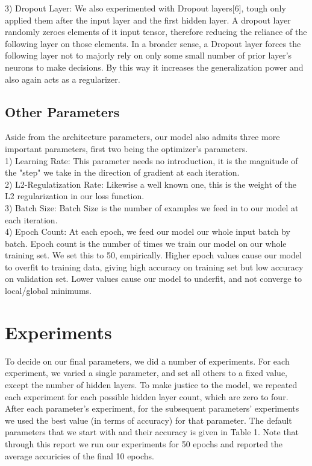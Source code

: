 \documentclass[conference,compsoc]{IEEEtran}
\begin{document}
3) Dropout Layer: We also experimented with Dropout layers[6], tough only applied them after the input layer and the first hidden layer. A dropout layer randomly zeroes elements of it input tensor, therefore reducing the reliance of the following layer on those elements. In a broader sense, a Dropout layer forces the following layer not to majorly rely on only some small number of prior layer's neurons to make decisions. By this way it increases the generalization power and also again acts as a regularizer.\\

\subsection{Other Parameters}

Aside from the architecture parameters, our model also admits three more important parameters, first two being the optimizer's parameters. \\

1) Learning Rate: This parameter needs no introduction, it is the magnitude of the "step" we take in the direction of gradient at each iteration. \\

2) L2-Regulatization Rate: Likewise a well known one, this is the weight of the L2 regularization in our loss function. \\

3) Batch Size: Batch Size is the number of examples we feed in to our model at each iteration. \\

4) Epoch Count: At each epoch, we feed our model our whole input batch by batch.  Epoch count is the number of times we train our model on our whole training set. We set this to 50, empirically. Higher epoch values cause our model to overfit to training data, giving high accuracy on training set but low accuracy on validation set. Lower values cause our model to underfit, and not converge to local/global minimums. \\

\section{Experiments}

To decide on our final parameters, we did a number of experiments. For each experiment, we varied a single parameter, and set all others to a fixed value, except the number of hidden layers. To make justice to the model, we repeated each experiment for each possible hidden layer count, which are zero to four. After each parameter's experiment, for the subsequent parameters' experiments we used the best value (in terms of accuracy) for that parameter. The default parameters that we start with and their accuracy is given in Table 1.  Note that through this report we run our experiments for 50 epochs and reported the average accuricies of the final 10 epochs. \\
\end{document}
